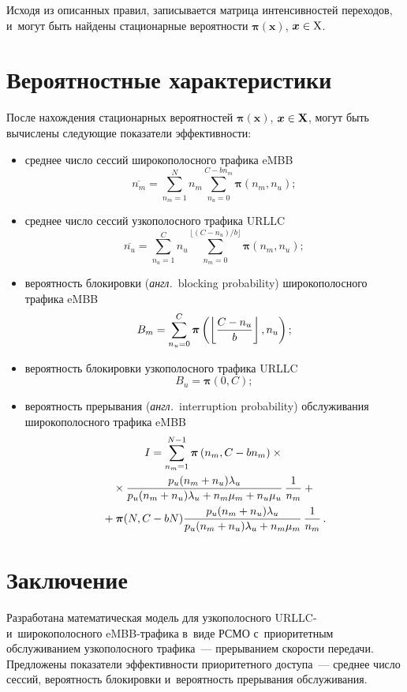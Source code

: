 \begin{multicols}{2}
  Исходя из описанных правил, записывается мат\-ри\-ца интенсивностей 
переходов, и~могут быть найдены стационарные вероятности 
$\bm{\pi}(\bm{x})$, $\bm{x}\hm\in \mathrm{X}$.

\section{Вероятностные характеристики}

  После нахождения стационарных вероятностей $\bm{\pi}(\bm{x})$, 
$\bm{x}\hm\in \mathbf{X}$, могут быть вычислены сле\-ду\-ющие показатели 
эффективности:
  \begin{itemize}
\item среднее число сессий широкополосного трафика eMBB
$$
\overline{n_m} =\sum\limits^N_{n_m=1} n_m \sum\limits_{n_u=0}^{C-bn_m} 
\bm{\pi} \left( n_m, n_u\right);
$$
\item среднее число сессий узкополосного трафика URLLC 
$$
\overline{n_u} =\sum\limits^C_{n_u=1} n_u \sum\limits_{n_m=0}^{\lfloor (C-
n_u)/b\rfloor}\bm{\pi} \left(n_m, n_u\right);
$$
\item вероятность блокировки (\textit{англ.}\ blocking probability) 
широкополосного трафика eMBB
$$
B_m= \sum\limits^C_{n_u=0} \bm{\pi} \left( \left\lfloor \displaystyle\frac{\displaystyle C-n_u\mathstrut}{\displaystyle b\mathstrut}\right\rfloor, 
n_u\right);
$$
\item вероятность блокировки узкополосного трафика URLLC
$$
B_u=\bm{\pi} (0,C);
$$
\item вероятность прерывания (\textit{англ.}\ interruption probability) 
обслуживания широкополосного трафика eMBB
\begin{multline*}
I=\sum\limits^{N-1}_{n_m=1} \bm{\pi} \left( n_m, C-bn_m\right) \times{}\\
{}\times
\displaystyle\frac{\displaystyle p_u(n_m+n_u)\lambda_u\mathstrut}{\displaystyle p_u(n_m+n_u)\lambda_u+n_m\mu_m+n_u\mu_u\mathstrut}\, 
\displaystyle\frac{\displaystyle 1\mathstrut}{\displaystyle n_m\mathstrut}+{}\\
{}+\bm{\pi} (N, C-bN) 
\displaystyle\frac{\displaystyle p_u(n_m+n_u)\lambda_u\mathstrut}{\displaystyle p_u(n_m+n_u)\lambda_u+n_m\mu_m\mathstrut}\,\displaystyle\frac{\displaystyle 1\mathstrut}{\displaystyle n_m\mathstrut}
\,.
\end{multline*}
\end{itemize}

\section{Заключение}
  
  Разработана математическая модель для узкополосного URLLC- 
и~широкополосного eMBB-тра\-фи\-ка в~виде РСМО с~приоритетным обслуживанием узкополосного трафика~--- 
прерыванием скорости передачи. Предложены показатели эффективности 
приоритетного доступа~--- среднее число сессий, вероятность блокировки 
и~вероятность прерывания обслуживания. 
  

\end{multicols}
